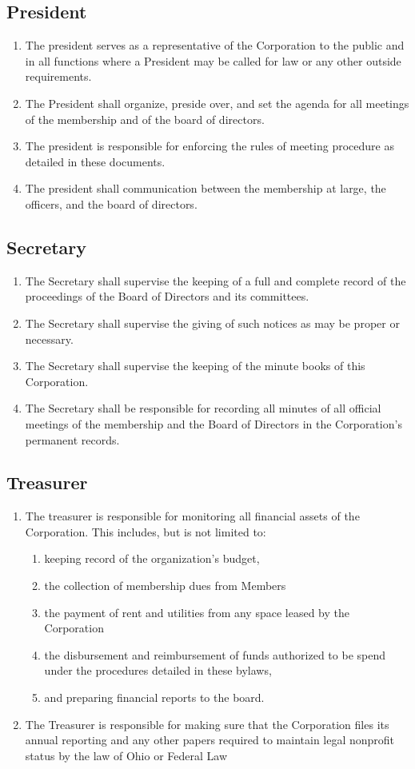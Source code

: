 \documentclass{article}
\begin{document}
\subsection{President}
\begin{enumerate}
  \item The president serves as a representative of the Corporation to the public and in all 
functions where a President may be called for law or any other outside requirements.
  \item The President shall organize, preside over, and set the agenda for all meetings of 
the membership and of the board of directors.
  \item The president is responsible for enforcing the rules of meeting procedure as 
detailed in these documents.
  \item The president shall communication between the membership at large, the 
officers, and the board of directors.
\end{enumerate}
\subsection{Secretary}
\begin{enumerate}
\item The Secretary shall supervise the keeping of a full and complete record of the 
proceedings of the Board of Directors and its committees.
\item The Secretary shall supervise the giving of such notices as may be proper or 
necessary.
\item The Secretary shall supervise the keeping of the minute books of this Corporation.
\item The Secretary shall be responsible for recording all minutes of all official meetings of 
the membership and the Board of Directors in the Corporation's permanent records.
\end{enumerate}
\subsection{Treasurer}
\begin{enumerate}
\item The treasurer is responsible for monitoring all financial assets of the Corporation.  
This includes, but is not limited to:
\begin{enumerate}
\item keeping record of the organization's budget,
\item the collection of membership dues from Members
\item the payment of rent and utilities from any space leased by the Corporation
\item the disbursement and reimbursement of funds authorized to be spend under the 
procedures detailed in these bylaws,
\item and preparing financial reports to the board.
\end{enumerate}
\item The Treasurer is responsible for making sure that the Corporation files its annual 
reporting and any other papers required to maintain legal nonprofit status by the law of 
Ohio or Federal Law
\end{enumerate}
\end{document}
